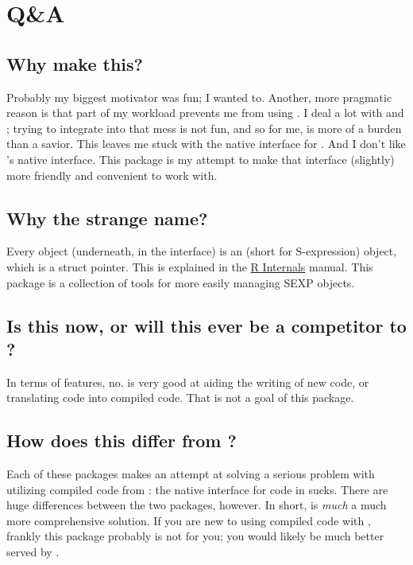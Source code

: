 \section{Q\&A}

\subsection{Why make this?}
Probably my biggest motivator was fun; I wanted to.  
Another, more pragmatic reason is that part of my workload prevents me from 
using .  I deal a lot with \C and \Fortran; trying to integrate \Cpp 
into that mess is not fun, and so for me,  is more of a burden than a 
savior.  This leaves me stuck with the native \C interface for \R.  And I don't 
like \R's native \C interface.  This package is my attempt to make that 
interface (slightly) more friendly and convenient to work with.


\subsection{Why the strange name?}
Every \R object (underneath, in the \C interface) is an  (short for
S-expression) object, which is a struct pointer.  This is explained in the
\href{http://cran.r-project.org/doc/manuals/R-ints.html#SEXPs}{R Internals} 
manual.  This package is a collection of tools for more easily managing SEXP 
objects.


\subsection{Is this now, or will this ever be a competitor to ?}
In terms of features, no.   is very good at aiding the writing of
new code, or translating \R code into compiled code.  That is not a goal
of this package.


\subsection{How does this differ from ?}\label{sec:rcppdiffs}
Each of these packages makes an attempt at solving a serious problem with 
utilizing compiled code from \R: the native interface for  code in 
\R sucks.  There are huge differences between the two packages, however. In 
short,  is \emph{much} a much more comprehensive solution.  If you are 
new to using compiled code with \R, frankly this package probably is not for 
you; you would likely be much better served by .  


